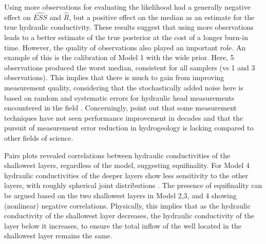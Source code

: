 Using more observations for evaluating the likelihood had a generally negative effect on $\widehat{ESS}$ and $\hat{R}$, but a positive effect on the median as an estimate for the true hydraulic conductivity. These results suggest that using more observations leads to a better estimate of the true posterior at the cost of a longer burn-in time. However, the quality of observations also played an important role. An example of this is the calibration of Model 1 with the wide prior. Here, 5 observations produced the worst median, consistent for all samplers (vs 1 and 3 observations). This implies that there is much to gain from improving measurement quality, considering that the stochastically added noise here is based on random and systematic errors for hydraulic head measurements encountered in the field \citep{rau2019error}. Concerningly, \cite{rau2019error} point out that some measurement techniques have not seen performance improvement in decades and that the pursuit of measurement error reduction in hydrogeology is lacking compared to other fields of science.


Pairs plots revealed correlations between hydraulic conductivities of the shallowest layers, regardless of the model, suggesting equifinality. For Model 4 hydraulic conductivities of the deeper layers show less sensitivity to the other layers, with roughly spherical joint distributions \citep{gelman2021bayesian}. The presence of equifinality can be argued based on the two shallowest layers in Model 2,3, and 4 showing (nonlinear) negative correlations. Physically, this implies that as the hydraulic conductivity of the shallowest layer decreases, the hydraulic conductivity of the layer below it increases, to ensure the total inflow of the well located in the shallowest layer remains the same. 

